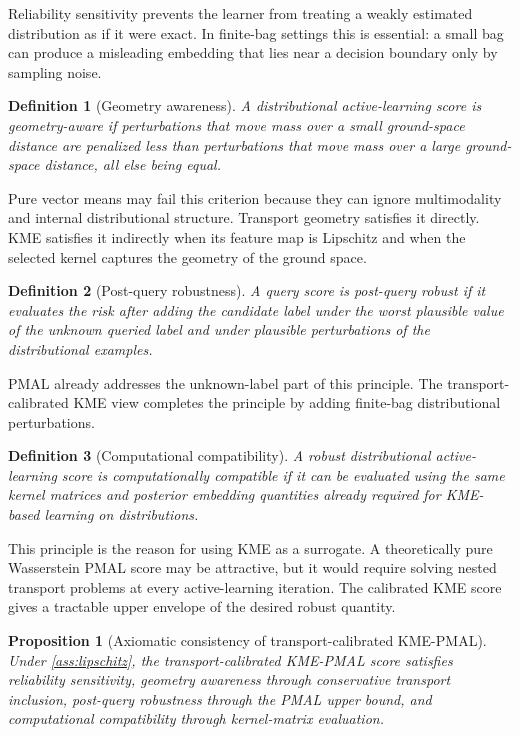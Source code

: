 \documentclass[10pt,journal]{IEEEtran}
\newtheorem{definition}{Definition}
\newtheorem{proposition}{Proposition}
\begin{document}
Reliability sensitivity prevents the learner from treating a weakly estimated distribution as if it were exact. In finite-bag settings this is essential: a small bag can produce a misleading embedding that lies near a decision boundary only by sampling noise.

\begin{definition}[Geometry awareness]
A distributional active-learning score is geometry-aware if perturbations that move mass over a small ground-space distance are penalized less than perturbations that move mass over a large ground-space distance, all else being equal.
\end{definition}

Pure vector means may fail this criterion because they can ignore multimodality and internal distributional structure. Transport geometry satisfies it directly. KME satisfies it indirectly when its feature map is Lipschitz and when the selected kernel captures the geometry of the ground space.

\begin{definition}[Post-query robustness]
A query score is post-query robust if it evaluates the risk after adding the candidate label under the worst plausible value of the unknown queried label and under plausible perturbations of the distributional examples.
\end{definition}

PMAL already addresses the unknown-label part of this principle. The transport-calibrated KME view completes the principle by adding finite-bag distributional perturbations.

\begin{definition}[Computational compatibility]
A robust distributional active-learning score is computationally compatible if it can be evaluated using the same kernel matrices and posterior embedding quantities already required for KME-based learning on distributions.
\end{definition}

This principle is the reason for using KME as a surrogate. A theoretically pure Wasserstein PMAL score may be attractive, but it would require solving nested transport problems at every active-learning iteration. The calibrated KME score gives a tractable upper envelope of the desired robust quantity.

\begin{proposition}[Axiomatic consistency of transport-calibrated KME-PMAL]
\label{prop:axioms}
Under \cref{ass:lipschitz}, the transport-calibrated KME-PMAL score satisfies reliability sensitivity, geometry awareness through conservative transport inclusion, post-query robustness through the PMAL upper bound, and computational compatibility through kernel-matrix evaluation.
\end{proposition}
\end{document}

